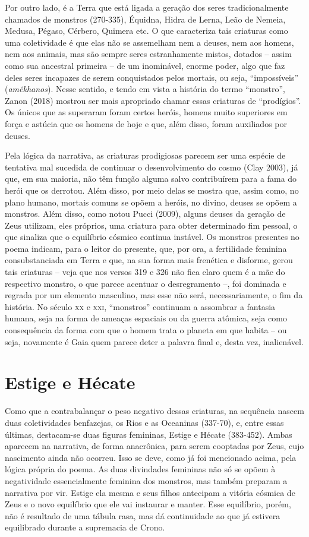 Por outro lado, é a Terra que está ligada a geração dos seres
tradicionalmente chamados de monstros (270-335), Équidna, Hidra de
Lerna, Leão de Nemeia, Medusa, Pégaso, Cérbero, Quimera etc. O que
caracteriza tais criaturas como uma coletividade é que elas não se
assemelham nem a deuses, nem aos homens, nem aos animais, mas são sempre
seres estranhamente mistos, dotados -- assim como sua ancestral primeira
-- de um inominável, enorme poder, algo que faz deles seres incapazes de
serem conquistados pelos mortais, ou seja, ``impossíveis''
(\emph{amêkhanos}). Nesse sentido, e tendo em vista a história do termo
``monstro'', Zanon (2018) mostrou ser mais apropriado chamar essas
criaturas de ``prodígios''. Os únicos que as superaram foram certos
heróis, homens muito superiores em força e astúcia que os homens de hoje
e que, além disso, foram auxiliados por deuses.

Pela lógica da narrativa, as criaturas prodigiosas parecem ser uma
espécie de tentativa mal sucedida de continuar o desenvolvimento do
cosmo (Clay 2003), já que, em sua maioria, não têm função alguma salvo
contribuírem para a fama do herói que os derrotou. Além disso, por meio
delas se mostra que, assim como, no plano humano, mortais comuns se
opõem a heróis, no divino, deuses se opõem a monstros. Além disso, como
notou Pucci (2009), alguns deuses da geração de Zeus utilizam, eles
próprios, uma criatura para obter determinado fim pessoal, o que
sinaliza que o equilíbrio cósmico continua instável. Os monstros
presentes no poema indicam, para o leitor do presente, que, por ora, a
fertilidade feminina consubstanciada em Terra e que, na sua forma mais
frenética e disforme, gerou tais criaturas -- veja que nos versos 319 e
326 não fica claro quem é a mãe do respectivo monstro, o que parece
acentuar o desregramento --, foi dominada e regrada por um elemento
masculino, mas esse não será, necessariamente, o fim da história. No
século \textsc{xx} e \textsc{xxi}, ``monstros'' continuam a assombrar a fantasia humana,
seja na forma de ameaças espaciais ou da guerra atômica, seja como
consequência da forma com que o homem trata o planeta em que habita --
ou seja, novamente é Gaia quem parece deter a palavra final e, desta
vez, inalienável.

\section{Estige e Hécate}

Como que a contrabalançar o peso negativo dessas criaturas, na sequência
nascem duas coletividades benfazejas, os Rios e as Oceaninas (337-70),
e, entre essas últimas, destacam-se duas figuras femininas, Estige e
Hécate (383-452). Ambas aparecem na narrativa, de forma anacrônica, para
serem cooptadas por Zeus, cujo nascimento ainda não ocorreu. Isso se
deve, como já foi mencionado acima, pela lógica própria do poema. As
duas divindades femininas não só se opõem à negatividade essencialmente
feminina dos monstros, mas também preparam a narrativa por vir. Estige
ela mesma e seus filhos antecipam a vitória cósmica de Zeus e o novo
equilíbrio que ele vai instaurar e manter. Esse equilíbrio, porém, não é
resultado de uma tábula rasa, mas dá continuidade ao que já estivera
equilibrado durante a supremacia de Crono.

